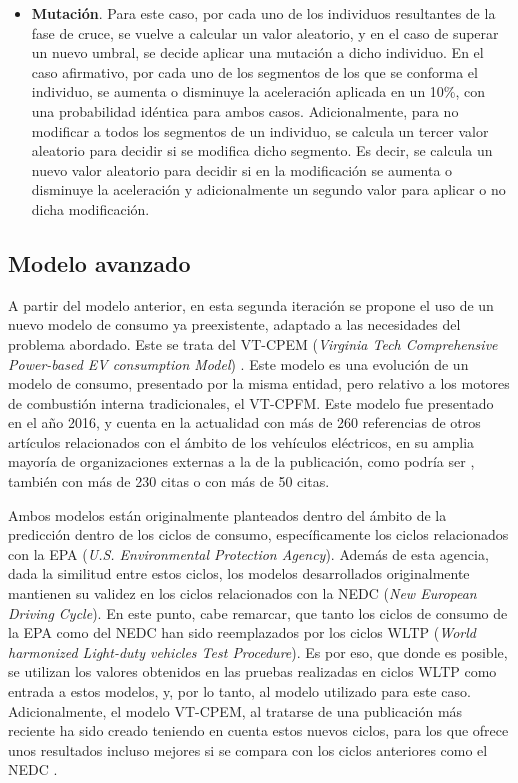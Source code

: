 \documentclass[11pt,spanish,listoffigures,listoftables]{tfgetsinf}
\begin{document}
\begin{itemize}
    \item \textbf{Mutación}. Para este caso, por cada uno de los individuos resultantes de la fase de cruce, se vuelve a calcular un valor aleatorio, y en el caso de superar un nuevo umbral, se decide aplicar una mutación a dicho individuo. En el caso afirmativo, por cada uno de los segmentos de los que se conforma el individuo, se aumenta o disminuye la aceleración aplicada en un 10\%, con una probabilidad idéntica para ambos casos. Adicionalmente, para no modificar a todos los segmentos de un individuo, se calcula un tercer valor aleatorio para decidir si se modifica dicho segmento. Es decir, se calcula un nuevo valor aleatorio para decidir si en la modificación se aumenta o disminuye la aceleración y adicionalmente un segundo valor para aplicar o no dicha modificación.
\end{itemize}
\newpage

\subsection{Modelo avanzado}
A partir del modelo anterior, en esta segunda iteración se propone el uso de un nuevo modelo de consumo ya preexistente, adaptado a las necesidades del problema abordado. Este se trata del VT-CPEM (\textit{Virginia Tech Comprehensive Power-based EV consumption Model}) \cite{FIORI2016257}. Este modelo es una evolución de un modelo de consumo, presentado por la misma entidad, pero relativo a los motores de combustión interna tradicionales, el VT-CPFM. Este modelo fue presentado en el año 2016, y cuenta en la actualidad con más de 260 referencias de otros artículos relacionados con el ámbito de los vehículos eléctricos, en su amplia mayoría de organizaciones externas a la de la publicación, como podría ser \cite{ZENG2019}, también con más de 230 citas o \cite{YUAN2017} con más de 50 citas.

Ambos modelos están originalmente planteados dentro del ámbito de la predicción dentro de los ciclos de consumo, específicamente los ciclos relacionados con la EPA (\textit{U.S. Environmental Protection Agency}). Además de esta agencia, dada la similitud entre estos ciclos, los modelos desarrollados originalmente mantienen su validez en los ciclos relacionados con la NEDC (\textit{New European Driving Cycle}). En este punto, cabe remarcar, que tanto los ciclos de consumo de la EPA como del NEDC han sido reemplazados por los ciclos WLTP (\textit{World harmonized Light-duty vehicles Test Procedure}). Es por eso, que donde es posible, se utilizan los valores obtenidos en las pruebas realizadas en ciclos WLTP como entrada a estos modelos, y, por lo tanto, al modelo utilizado para este caso. Adicionalmente, el modelo VT-CPEM, al tratarse de una publicación más reciente ha sido creado teniendo en cuenta estos nuevos ciclos, para los que ofrece unos resultados incluso mejores si se compara con los ciclos anteriores como el NEDC \cite{FIORI2016257}.
\end{document}
